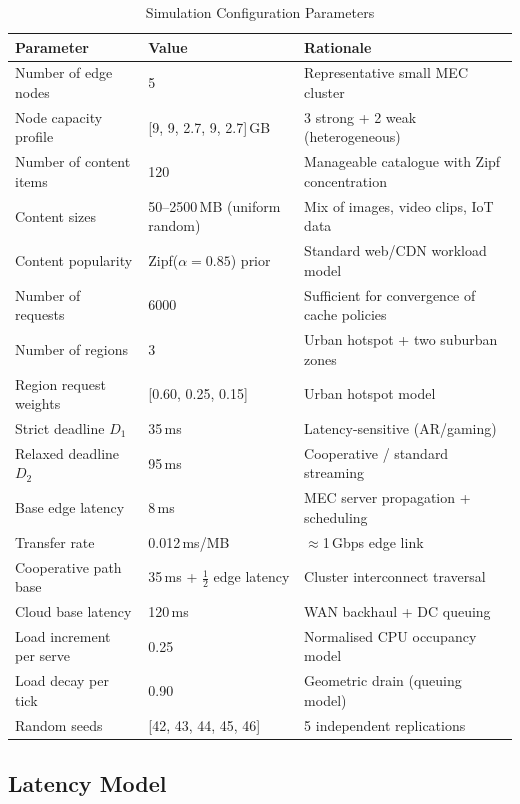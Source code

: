\documentclass[12pt,a4paper]{report}
\begin{document}
\begin{table}[H]
\centering
\caption{Simulation Configuration Parameters}
\label{tab:simconfig}
\renewcommand{\arraystretch}{1.3}
\begin{tabular}{L{5.5cm} L{5cm} L{4cm}}
\toprule
\textbf{Parameter} & \textbf{Value} & \textbf{Rationale}\\
\midrule
Number of edge nodes & 5 & Representative small MEC cluster\\
Node capacity profile & [9, 9, 2.7, 9, 2.7]\,GB & 3 strong + 2 weak (heterogeneous)\\
Number of content items & 120 & Manageable catalogue with Zipf concentration\\
Content sizes & 50--2500\,MB (uniform random) & Mix of images, video clips, IoT data\\
Content popularity & Zipf($\alpha = 0.85$) prior & Standard web/CDN workload model\\
Number of requests & 6000 & Sufficient for convergence of cache policies\\
Number of regions & 3 & Urban hotspot + two suburban zones\\
Region request weights & [0.60, 0.25, 0.15] & Urban hotspot model\\
Strict deadline $D_1$ & 35\,ms & Latency-sensitive (AR/gaming)\\
Relaxed deadline $D_2$ & 95\,ms & Cooperative / standard streaming\\
Base edge latency & 8\,ms & MEC server propagation + scheduling\\
Transfer rate & 0.012\,ms/MB & $\approx$1\,Gbps edge link\\
Cooperative path base & 35\,ms + $\frac{1}{2}$ edge latency & Cluster interconnect traversal\\
Cloud base latency & 120\,ms & WAN backhaul + DC queuing\\
Load increment per serve & 0.25 & Normalised CPU occupancy model\\
Load decay per tick & 0.90 & Geometric drain (queuing model)\\
Random seeds & [42, 43, 44, 45, 46] & 5 independent replications\\
\bottomrule
\end{tabular}
\end{table}

\subsection{Latency Model}
\end{document}
